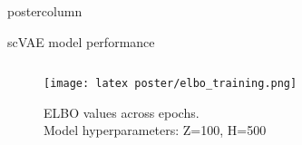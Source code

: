 \documentclass[final,hyperref={pdfpagelabels=false}]{beamer}
\begin{document}
\begin{frame}
\begin{columns}
\begin{column}{.49\paperwidth}
\begin{beamercolorbox}[center,wd=\textwidth]{postercolumn}
\begin{minipage}[T]{.99\textwidth}
{
\vfill




\vfill

\begin{block}{scVAE model performance}
\begin{columns}
\begin{column}{1\textwidth}

    \centering
    \begin{minipage}[t]{0.96\textwidth}

    \begin{columns}
    \begin{column}{0.50\textwidth} 
    \centering

    \begin{figure}
        \texttt{[image: latex poster/elbo\_training.png]}
        \centering
        \caption{ELBO values across epochs. \\ Model hyperparameters: Z=100, H=500}
         \label{figure:elbo}
    \end{figure}  


\end{column}
\end{columns}
\end{minipage}
\end{column}
\end{columns}
\end{block}}
\end{minipage}
\end{beamercolorbox}
\end{column}
\end{columns}
\end{frame}
\end{document}
